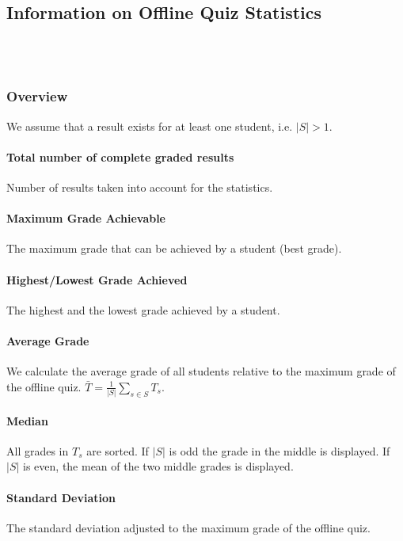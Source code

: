 \documentclass[12pt]{report}
\begin{document}
\subsection{Information on Offline Quiz Statistics}

\ \\
\ \\

\subsubsection{Overview}
\label{subsubsec:overview}

We assume that a result exists for at least one student, i.e. $|S|>1$.

\paragraph{Total number of complete graded results}
Number of results taken into account for the statistics.

\paragraph{Maximum Grade Achievable}
The maximum grade that can be achieved by a student (best grade).

\paragraph{Highest/Lowest Grade Achieved}
The highest and the lowest grade achieved by a student.

\paragraph{Average Grade}
We calculate the average grade of all students relative to the maximum grade of the offline quiz.
$\bar{T}=\frac{1}{|S|}\sum\limits_{s\in S}T_s$.

\paragraph{Median}
All grades in $T_s$ are sorted. If $|S|$ is odd the grade in the middle is displayed. If $|S|$ is even, the mean of the two middle grades is displayed.


\paragraph{Standard Deviation}
The standard deviation adjusted to the maximum grade of the offline quiz.
\end{document}
